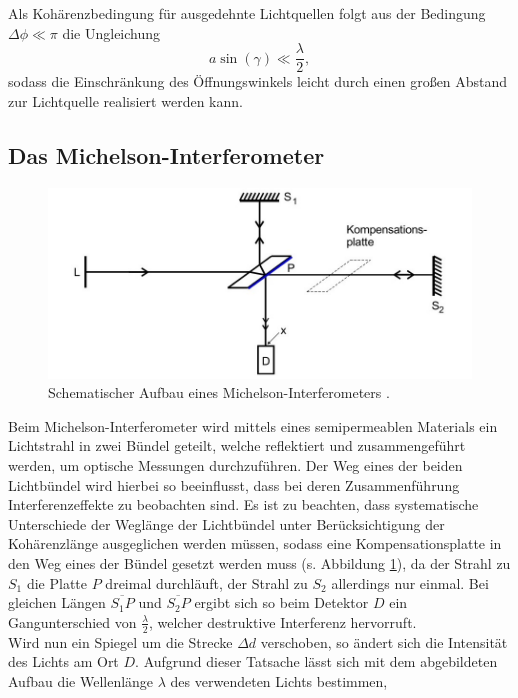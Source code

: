 Als Kohärenzbedingung für ausgedehnte Lichtquellen folgt aus der Bedingung $\Delta \phi \ll \pi$ die Ungleichung
\begin{equation}
  a \sin(\gamma) \ll \frac{\lambda}{2},
\end{equation}
sodass die Einschränkung des Öffnungswinkels leicht durch einen großen Abstand zur Lichtquelle realisiert werden kann.

\subsection{Das Michelson-Interferometer}
\begin{figure}[H]
  \centering
  \includegraphics[scale=0.7]{Schema.jpg}
  \caption{Schematischer Aufbau eines Michelson-Interferometers \cite{Anleitung}.}
  \label{fig:schema}
\end{figure}
Beim Michelson-Interferometer wird mittels eines semipermeablen Materials ein Lichtstrahl in zwei Bündel geteilt, welche
reflektiert und zusammengeführt werden, um optische Messungen durchzuführen. 
Der Weg eines der beiden Lichtbündel wird hierbei so beeinflusst, dass bei deren
Zusammenführung Interferenzeffekte zu beobachten sind. Es ist zu beachten, dass systematische Unterschiede der Weglänge der
Lichtbündel unter Berücksichtigung der Kohärenzlänge ausgeglichen werden müssen, sodass eine Kompensationsplatte in den Weg eines der Bündel gesetzt werden muss (s. Abbildung \ref{fig:schema}),
da der Strahl zu $S_1$ die Platte $P$ dreimal durchläuft, der Strahl zu $S_2$ allerdings nur einmal. Bei gleichen Längen 
$\overline{S_1 P}$ und $\overline{S_2 P}$ ergibt sich so beim Detektor $D$ ein Gangunterschied von $\frac{\lambda}{2}$, welcher
destruktive Interferenz hervorruft. \\
Wird nun ein Spiegel um die Strecke $\Delta d$ verschoben, so ändert sich die Intensität des Lichts am Ort $D$.
Aufgrund dieser Tatsache lässt sich mit dem abgebildeten Aufbau die Wellenlänge $\lambda$ des verwendeten Lichts bestimmen,
